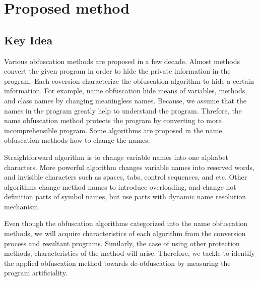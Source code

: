 \documentclass[conference]{IEEEtran}
\begin{document}
\section{Proposed method}\label{sect:method}

\subsection{Key Idea}

Various obfuscation methods are proposed in a few decade.  Almost
methods convert the given program in order to hide the private
information in the program.  Each coversion characterize the
obfuscation algorithm to hide a certain information.
%
For example, name obfuscation hide means of variables, methods, and
class names by changing meaningless names\cite{tyma00patent}.
Because, we assume that the names in the program greatly help to
understand the program.  Threfore, the name obfuscation method
protects the program by converting to more incomprehensible program.
Some algorithms are proposed in the name obfuscation methods how to
change the names.

Straightforward algorithm is to change variable names into one
alphabet characters.  More powerful algorithm changes variable names
into reserved words, and invisible characters such as spaces, tabs,
control sequences, and etc\cite{dasho}.  Other algorithms change
method names to introduce overloading\cite{tyma00patent}, and change
not definition parts of symbol names, but use parts with dynamic name
resolution mechanism\cite{tamada07ieice,tamada08iasted}.

Even though the obfuscation algorithms categorized into the name
obfuscation methods, we will acquire characteristics of each algorithm
from the conversion process and resultant programs.
%
Similarly, the case of using other protection methods, characteristics
of the method will arise.  Therefore, we tackle to identify the
applied obfuscation method towards de-obfuscation by measuring the
program artificiality.
\end{document}
